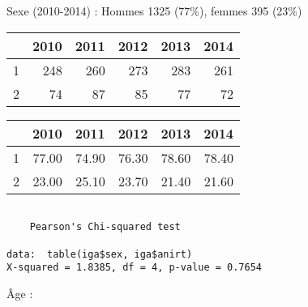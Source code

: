 \documentclass[11pt,a4paper]{article}\usepackage[]{graphicx}\usepackage[]{color}
\makeatletter
\newenvironment{kframe}{%
 \def\at@end@of@kframe{}%
 \ifinner\ifhmode%
  \def\at@end@of@kframe{\end{minipage}}%
  \begin{minipage}{\columnwidth}%
 \fi\fi%
 \def\FrameCommand##1{\hskip\@totalleftmargin \hskip-\fboxsep
 \colorbox{shadecolor}{##1}\hskip-\fboxsep
     \hskip-\linewidth \hskip-\@totalleftmargin \hskip\columnwidth}%
 \MakeFramed {\advance\hsize-\width
   \@totalleftmargin\z@ \linewidth\hsize
   \@setminipage}}%
 {\par\unskip\endMakeFramed%
 \at@end@of@kframe}
\newenvironment{knitrout}{}{} %
\makeatother
\begin{document}
Sexe (2010-2014) : Hommes 1325 (77\%), femmes 395 (23\%)
\begin{table}[ht]
\centering
\begin{tabular}{rrrrrr}
  \hline
 & 2010 & 2011 & 2012 & 2013 & 2014 \\ 
  \hline
1 & 248 & 260 & 273 & 283 & 261 \\ 
  2 &  74 &  87 &  85 &  77 &  72 \\ 
   \hline
\end{tabular}
\end{table}
\begin{table}[ht]
\centering
\begin{tabular}{rrrrrr}
  \hline
 & 2010 & 2011 & 2012 & 2013 & 2014 \\ 
  \hline
1 & 77.00 & 74.90 & 76.30 & 78.60 & 78.40 \\ 
  2 & 23.00 & 25.10 & 23.70 & 21.40 & 21.60 \\ 
   \hline
\end{tabular}
\end{table}


\begin{knitrout}
\color{fgcolor}\begin{kframe}
\begin{verbatim}

	Pearson's Chi-squared test

data:  table(iga$sex, iga$anirt)
X-squared = 1.8385, df = 4, p-value = 0.7654
\end{verbatim}
\end{kframe}
\end{knitrout}

Âge :
\end{document}
